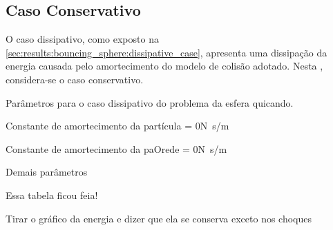 \subsection{Caso Conservativo} \label{sec:results:bouncing_sphere:conservative}

O caso dissipativo, como exposto na \cref{sec:results:bouncing_sphere:dissipative_case}, apresenta uma dissipação da energia causada pelo amortecimento do modelo de colisão adotado. Nesta , considera-se o caso conservativo.

\begin{table}[h]
\centering
\caption{Parâmetros para o caso dissipativo do problema da esfera quicando.}
\label{tab:bouncing_sphere:conservative:parameters}
\begin{parametersdesc}
	\item{Constante de amortecimento da partícula}{\ind{\normalDampingConstant}{\particle} = 0}{\si[per-mode=symbol]{\newton\second\per\meter}}
	\item{Constante de amortecimento da paOrede}{\ind{\normalDampingConstant}{\element} = 0}{\si[per-mode=symbol]{\newton\second\per\meter}}
	\item{Demais parâmetros}{}{}
\end{parametersdesc}
\sourceMe 
\end{table}
\alert{Essa tabela ficou feia!}

\alert{Tirar o gráfico da energia e dizer que ela se conserva exceto nos choques}

